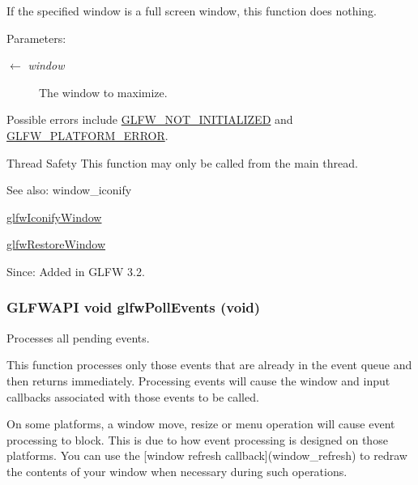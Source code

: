 If the specified window is a full screen window, this function does nothing.

\begin{Desc}
\item[Parameters:]
\begin{description}
\item[\mbox{$\leftarrow$} {\em window}]The window to maximize.\end{description}
\end{Desc}
Possible errors include \hyperlink{group__errors_g2374ee02c177f12e1fa76ff3ed15e14a}{GLFW\_\-NOT\_\-INITIALIZED} and \hyperlink{group__errors_gd44162d78100ea5e87cdd38426b8c7a1}{GLFW\_\-PLATFORM\_\-ERROR}.

\begin{Desc}
\item[Thread Safety]This function may only be called from the main thread.\end{Desc}
\begin{Desc}
\item[See also:]window\_\-iconify 

\hyperlink{group__window_g24274e3c6ecd44e11fec5e6b66e4d7f3}{glfwIconifyWindow} 

\hyperlink{group__window_g1e29caf0b819f578b04db52fff17256c}{glfwRestoreWindow}\end{Desc}
\begin{Desc}
\item[Since:]Added in GLFW 3.2. \end{Desc}
\hypertarget{group__window_g872d16e4c77f58c0436f356255920cfc}{
\subsubsection[glfwPollEvents]{\setlength{\rightskip}{0pt plus 5cm}GLFWAPI void glfwPollEvents (void)}}
\label{group__window_g872d16e4c77f58c0436f356255920cfc}


Processes all pending events. 

This function processes only those events that are already in the event queue and then returns immediately. Processing events will cause the window and input callbacks associated with those events to be called.

On some platforms, a window move, resize or menu operation will cause event processing to block. This is due to how event processing is designed on those platforms. You can use the \mbox{[}window refresh callback\mbox{]}(window\_\-refresh) to redraw the contents of your window when necessary during such operations.

